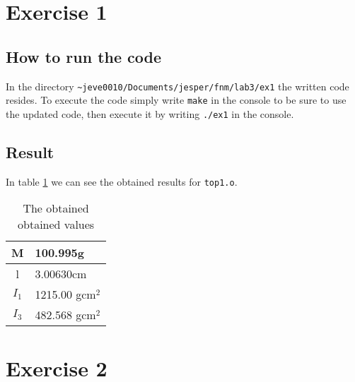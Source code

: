 \documentclass[11pt]{article}
\begin{document}
\section{Exercise 1}
\subsection{How to run the code}
In the directory \verb+~jeve0010/Documents/jesper/fnm/lab3/ex1+ the written code resides. To execute the code simply write \verb+make+ in the console to be sure to use the updated code, then execute it by writing \verb+./ex1+ in the console.

\subsection{Result}
In table \ref{table:ex1Res} we can see the obtained results for \verb+top1.o+.
\begin{table}[h]\center\Large
  \caption{The obtained obtained values}
  \begin{tabular}{c|l}
  M & 100.995g \\ \hline
  l & 3.00630cm \\ \hline
  $I_1$ & 1215.00 gcm$^2$ \\ \hline
  $I_3$ & 482.568 gcm$^2$ 
  \end{tabular}
  \label{table:ex1Res}
\end{table}

\section{Exercise 2}
\end{document}
